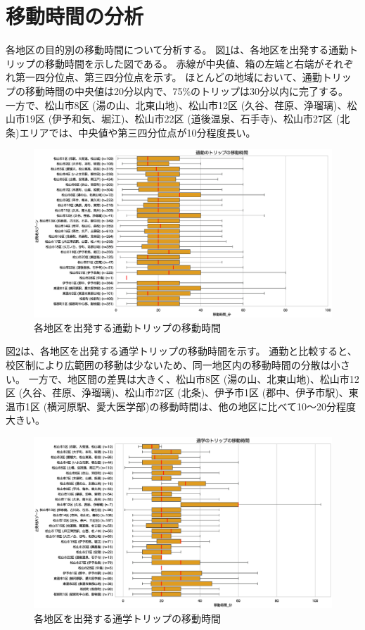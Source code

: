\documentclass[a4paper,12pt, uplatex]{jsbook}
\begin{document}
\section{移動時間の分析}
各地区の目的別の移動時間について分析する。
図\ref{fig:time_commute}は、各地区を出発する通勤トリップの移動時間を示した図である。
赤線が中央値、箱の左端と右端がそれぞれ第一四分位点、第三四分位点を示す。
ほとんどの地域において、通勤トリップの移動時間の中央値は20分以内で、75\%のトリップは30分以内に完了する。
一方で、松山市8区 (湯の山、北東山地)、松山市12区 (久谷、荏原、浄瑠璃)、松山市19区 (伊予和気、堀江)、松山市22区 (道後温泉、石手寺)、松山市27区 (北条)エリアでは、中央値や第三四分位点が10分程度長い。
%
\begin{figure}[H]
    \centering
    \includegraphics[width=1.0\textwidth]{picture/time_通勤.eps}
    \caption{各地区を出発する通勤トリップの移動時間}
    \label{fig:time_commute}
\end{figure}

\clearpage
図\ref{fig:time_school}は、各地区を出発する通学トリップの移動時間を示す。
通勤と比較すると、校区制により広範囲の移動は少ないため、同一地区内の移動時間の分散は小さい。
一方で、地区間の差異は大きく、松山市8区 (湯の山、北東山地)、松山市12区 (久谷、荏原、浄瑠璃)、松山市27区 (北条)、伊予市1区 (郡中、伊予市駅)、東温市1区 (横河原駅、愛大医学部)の移動時間は、他の地区に比べて10〜20分程度大きい。
%
\begin{figure}[H]
    \centering
    \includegraphics[width=1.0\textwidth]{picture/time_通学.eps}
    \caption{各地区を出発する通学トリップの移動時間}
    \label{fig:time_school}
\end{figure}
\end{document}
